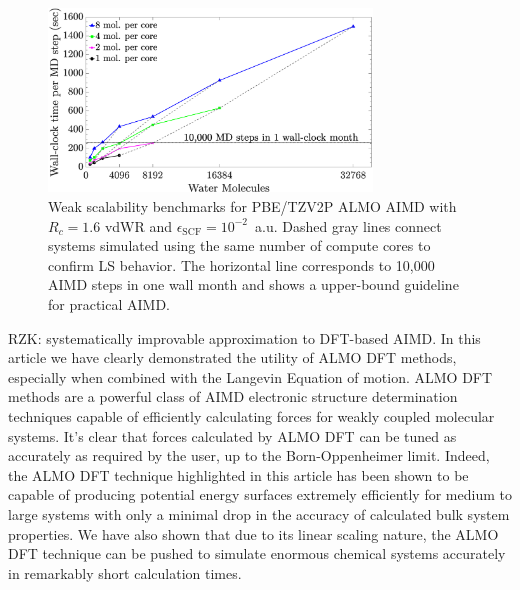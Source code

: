 \documentclass[aps,prl,reprint,amsmath,amssymb]{revtex4-1}
\begin{document}
\begin{figure}
\includegraphics[trim={1.6cm 0cm 4.7cm 0cm},clip,width=8.6cm]{weakscaling.eps}
\caption{\label{fig:weakscaling} Weak scalability benchmarks for PBE/TZV2P ALMO AIMD with  $R_{c} = 1.6$ vdWR and $\epsilon_{\text{SCF}} = 10^{-2}$~a.u. 
Dashed gray lines connect systems simulated using the same number of compute cores to confirm LS behavior. %
The horizontal line corresponds to 10,000 AIMD steps in one wall month and shows a upper-bound guideline for practical AIMD.
}
\end{figure}


RZK: systematically improvable approximation to DFT-based AIMD.
In this article we have clearly demonstrated the utility of ALMO DFT methods, especially when combined with the Langevin Equation of motion.
ALMO DFT methods are a powerful class of AIMD electronic structure determination techniques capable of efficiently calculating forces for weakly coupled molecular systems.
It's clear that forces calculated by ALMO DFT can be tuned as accurately as required by the user, up to the Born-Oppenheimer limit.
Indeed, the ALMO DFT technique highlighted in this article has been shown to be capable of producing potential energy surfaces extremely efficiently for medium to large systems with only a minimal drop in the accuracy of calculated bulk system properties.
We have also shown that due to its linear scaling nature, the ALMO DFT technique can be pushed to simulate enormous chemical systems accurately in remarkably short calculation times.

\end{document}
